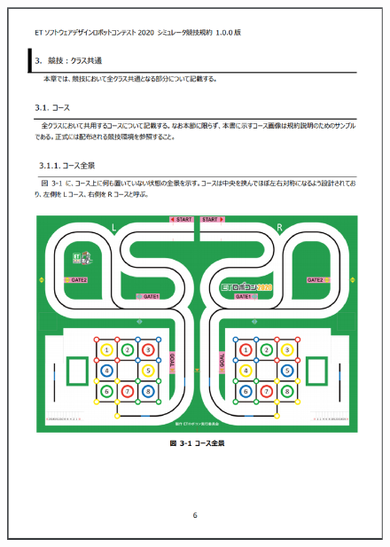 \documentclass[uplatex, report, a4j, 10pt]{jsbook}
\begin{document}
\begin{figure}[tp]
    \begin{center}
    \includegraphics[width=\hsize]{specification/ET_3.eps}
    \end{center}
\end{figure}
\end{document}
